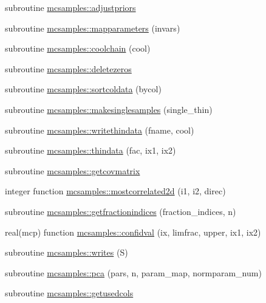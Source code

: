\begin{DoxyCompactItemize}
\item 
subroutine \mbox{\hyperlink{namespacemcsamples_aa4af8bb5067761fcc26783a3198edb1a}{mcsamples\+::adjustpriors}}
\item 
subroutine \mbox{\hyperlink{namespacemcsamples_ac831b94ceae7c808b2656230727e6cdd}{mcsamples\+::mapparameters}} (invars)
\item 
subroutine \mbox{\hyperlink{namespacemcsamples_a415388e77f0a5360c5a814c8ba0e4080}{mcsamples\+::coolchain}} (cool)
\item 
subroutine \mbox{\hyperlink{namespacemcsamples_a35bad035408957649f1a00bc87bc798c}{mcsamples\+::deletezeros}}
\item 
subroutine \mbox{\hyperlink{namespacemcsamples_af00e1e65ba0440ba9f05136bb9219f55}{mcsamples\+::sortcoldata}} (bycol)
\item 
subroutine \mbox{\hyperlink{namespacemcsamples_a1e8b234ac939c21f51884cab29fd0204}{mcsamples\+::makesinglesamples}} (single\+\_\+thin)
\item 
subroutine \mbox{\hyperlink{namespacemcsamples_a98999c53910240226ec96e8ef0751a22}{mcsamples\+::writethindata}} (fname, cool)
\item 
subroutine \mbox{\hyperlink{namespacemcsamples_ad5ab7ed94d3a34782ce86ebc0d23e148}{mcsamples\+::thindata}} (fac, ix1, ix2)
\item 
subroutine \mbox{\hyperlink{namespacemcsamples_a3b127162be572d0864c8bd49f3403a78}{mcsamples\+::getcovmatrix}}
\item 
integer function \mbox{\hyperlink{namespacemcsamples_ac9c93f48a6a5f4c22e5f35b060bcab20}{mcsamples\+::mostcorrelated2d}} (i1, i2, direc)
\item 
subroutine \mbox{\hyperlink{namespacemcsamples_a45291f5f8d4db1ad22598222a511e67c}{mcsamples\+::getfractionindices}} (fraction\+\_\+indices, n)
\item 
real(mcp) function \mbox{\hyperlink{namespacemcsamples_affe201ec04f01f217a706350334d21e4}{mcsamples\+::confidval}} (ix, limfrac, upper, ix1, ix2)
\item 
subroutine \mbox{\hyperlink{namespacemcsamples_a54c3f403eb92b30ff78476abea37462c}{mcsamples\+::writes}} (S)
\item 
subroutine \mbox{\hyperlink{namespacemcsamples_a72e8a848ae68643f3449e12e33334870}{mcsamples\+::pca}} (pars, n, param\+\_\+map, normparam\+\_\+num)
\item 
subroutine \mbox{\hyperlink{namespacemcsamples_a4664c132197f4ef65fa541baac30f0f2}{mcsamples\+::getusedcols}}

\end{DoxyCompactItemize}
